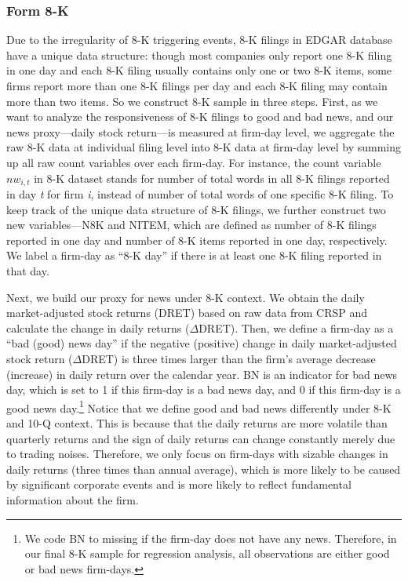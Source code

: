 \documentclass[a4paper]{article}
\begin{document}
\begin{spacing}{2}
\subsubsection{Form 8-K}
Due to the irregularity of 8-K triggering events, 8-K filings in EDGAR database have a unique data structure: though most companies only report one 8-K filing in one day and each 8-K filing usually contains only one or two 8-K items, some firms report more than one 8-K filings per day and each 8-K filing may contain more than two items. So we construct 8-K sample in three steps. First, as we want to analyze the responsiveness of 8-K filings to good and bad news, and our news proxy---daily stock return---is measured at firm-day level, we aggregate the raw 8-K data at individual filing level into 8-K data at firm-day level by summing up all raw count variables over each firm-day. For instance, the count variable $nw_{i,t}$ in 8-K dataset stands for number of total words in all 8-K filings reported in day \textit{t} for firm \textit{i}, instead of number of total words of one specific 8-K filing. To keep track of the unique data structure of 8-K filings, we further construct two new variables---N8K and NITEM, which are defined as number of 8-K filings reported in one day and number of 8-K items reported in one day, respectively. We label a firm-day as ``8-K day” if there is at least one 8-K filing reported in that day.

Next, we build our proxy for news under 8-K context. We obtain the daily market-adjusted stock returns (DRET) based on raw data from CRSP and calculate the change in daily returns ($\Delta$DRET). Then, we define a firm-day as a ``bad (good) news day” if the negative (positive) change in daily market-adjusted stock return ($\Delta$DRET) is three times larger than the firm's average decrease (increase) in daily return over the calendar year. BN is an indicator for bad news day, which is set to 1 if this firm-day is a bad news day, and 0 if this firm-day is a good news day.\footnote{We code BN to missing if the firm-day does not have any news. Therefore, in our final 8-K sample for regression analysis, all observations are either good or bad news firm-days.} Notice that we define good and bad news differently under 8-K and 10-Q context. This is because that the daily returns are more volatile than quarterly returns and the sign of daily returns can change constantly merely due to trading noises. Therefore, we only focus on firm-days with sizable changes in daily returns (three times than annual average), which is more likely to be caused by significant corporate events and is more likely to reflect fundamental information about the firm.


\end{spacing}
\end{document}
